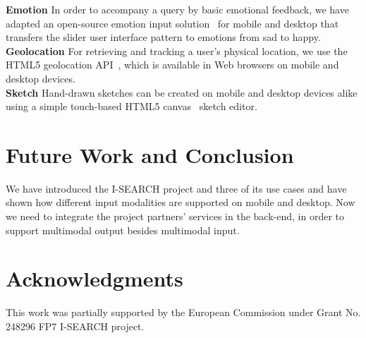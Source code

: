 \documentclass{sig-alternate}
\newcommand{\inlinelistingsize}{\fontsize{8pt}{11pt}}
\let\oldttdefault\ttdefault
\renewcommand{\ttdefault}{pcr}
\let\oldurl\url
\renewcommand{\url}[1]{\inlinelistingsize\oldurl{#1}}
\begin{document}
\noindent \textbf{Emotion}
In order to accompany a query by basic emotional feedback, we have adapted an open-source emotion input solution~\cite{emotionslider} for mobile and desktop that transfers the slider user interface pattern to emotions from sad to happy.\\ 

\noindent \textbf{Geolocation}
For retrieving and tracking a user's physical location, we use the HTML5 geolocation API~\cite{geolocation}, which is available in Web browsers on mobile and desktop devices.\\

\noindent \textbf{Sketch}
Hand-drawn sketches can be created on mobile and desktop devices alike using a simple touch-based HTML5 canvas~\cite{canvas} sketch editor.

\section{Future Work and Conclusion}
We have introduced the \mbox{I-SEARCH} project and three of its use cases and have shown how different input modalities are supported on mobile and desktop. Now we need to integrate the project partners' services in the back-end, in order to support multimodal output besides multimodal input.

\section{Acknowledgments}
This work was partially supported by the European Commission under Grant No. 248296 FP7 \mbox{I-SEARCH} project.

\let\ttdefault\oldttdefault
\let\url\oldurl




\balancecolumns
\end{document}
